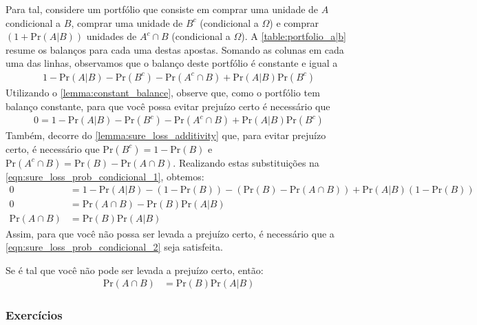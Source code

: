 Para tal, considere um portfólio que 
consiste em comprar uma unidade de $A$ condicional a $B$,
comprar uma unidade de $B^{c}$ (condicional a $\Omega$) e 
comprar $(1+\text{Pr}(A|B))$ unidades de 
$A^{c} \cap B$ (condicional a $\Omega$).
A \cref{table:portfolio_a|b} resume os balanços para 
cada uma destas apostas.
Somando as colunas em cada uma das linhas, 
observamos que o balanço deste portfólio é 
constante e igual a
\begin{align*}
 1-\text{Pr}(A|B)-\text{Pr}(B^{c})
 -\text{Pr}(A^{c} \cap B)
 +\text{Pr}(A|B)\text{Pr}(B^{c})
\end{align*}
Utilizando o \cref{lemma:constant_balance}, observe que, como o portfólio tem balanço constante,
para que você possa evitar prejuízo certo é 
necessário que
\begin{align}
 \label{eqn:sure_loss_prob_condicional_1}
 0 = 1-\text{Pr}(A|B)-\text{Pr}(B^{c})
 -\text{Pr}(A^{c} \cap B)
 +\text{Pr}(A|B)\text{Pr}(B^{c})
\end{align}
Também, decorre do \cref{lemma:sure_loss_additivity} que,
para evitar prejuízo certo, é 
necessário que $\text{Pr}(B^{c}) = 1-\text{Pr}(B)$ e
$\text{Pr}(A^{c} \cap B) = \text{Pr}(B)-\text{Pr}(A \cap B)$. 
Realizando estas substituições na
\cref{eqn:sure_loss_prob_condicional_1},  obtemos:
\begin{align}
 \label{eqn:sure_loss_prob_condicional_2}
 0 &= 1-\text{Pr}(A|B)-(1-\text{Pr}(B))
 -(\text{Pr}(B)-\text{Pr}(A \cap B))
 +\text{Pr}(A|B)(1-\text{Pr}(B)) \nonumber \\
 0 &= \text{Pr}(A \cap B) 
 -\text{Pr}(B)\text{Pr}(A|B) \nonumber \\
 \text{Pr}(A \cap B) &= \text{Pr}(B)\text{Pr}(A|B)
\end{align}
Assim, para que você não possa ser 
levada a prejuízo certo,
é necessário que a 
\cref{eqn:sure_loss_prob_condicional_2} 
seja satisfeita.

\begin{lemma}
 \label{lemma:sure_loss_conditional}
 Se  é tal que você não pode 
 ser levada a prejuízo certo, então:
 \begin{align*}
  \text{Pr}(A \cap B)
  &= \text{Pr}(B)\text{Pr}(A|B)
 \end{align*}
\end{lemma}

\subsubsection*{Exercícios}

